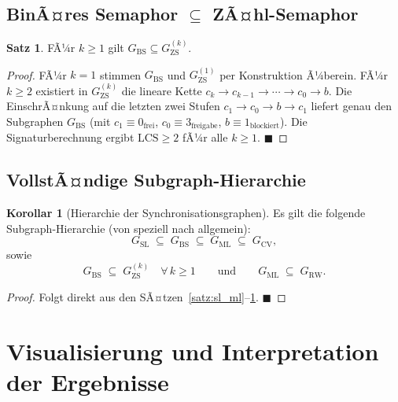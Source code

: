 ﻿\documentclass[a4paper,12pt]{article}
\theoremstyle{definition}
\newtheorem{satz}{Satz}
\newtheorem{korollar}{Korollar}
\begin{document}
\subsection{BinÃ¤res Semaphor $\subseteq$ ZÃ¤hl-Semaphor}

\begin{satz}
  \label{satz:bs_zs}
  FÃ¼r $k \geq 1$ gilt $G_{\mathrm{BS}} \subseteq G_{\mathrm{ZS}}^{(k)}$.
\end{satz}

\begin{proof}
  FÃ¼r $k = 1$ stimmen $G_{\mathrm{BS}}$ und $G_{\mathrm{ZS}}^{(1)}$ per
  Konstruktion Ã¼berein. FÃ¼r $k \geq 2$ existiert in $G_{\mathrm{ZS}}^{(k)}$
  die lineare Kette $c_k \to c_{k-1} \to \cdots \to c_0 \to b$. Die
  EinschrÃ¤nkung auf die letzten zwei Stufen $c_1 \to c_0 \to b \to c_1$
  liefert genau den Subgraphen $G_{\mathrm{BS}}$ (mit $c_1 \equiv
  0_{\mathrm{frei}}$, $c_0 \equiv 3_{\mathrm{freigabe}}$,
  $b \equiv 1_{\mathrm{blockiert}}$).
  Die Signaturberechnung ergibt $\mathrm{LCS} \geq 2$ fÃ¼r alle $k \geq 1$.
  \hfill$\blacksquare$
\end{proof}

\subsection{VollstÃ¤ndige Subgraph-Hierarchie}

\begin{korollar}[Hierarchie der Synchronisationsgraphen]
  \label{kor:hierarchie}
  Es gilt die folgende Subgraph-Hierarchie (von speziell nach allgemein):
  \[
    G_{\mathrm{SL}} \;\subseteq\; G_{\mathrm{BS}} \;\subseteq\;
    G_{\mathrm{ML}} \;\subseteq\; G_{\mathrm{CV}},
  \]
  sowie
  \[
    G_{\mathrm{BS}} \;\subseteq\; G_{\mathrm{ZS}}^{(k)} \quad \forall\, k \geq 1
    \qquad\text{und}\qquad
    G_{\mathrm{ML}} \;\subseteq\; G_{\mathrm{RW}}.
  \]
\end{korollar}

\begin{proof}
  Folgt direkt aus den SÃ¤tzen~\ref{satz:sl_ml}--\ref{satz:bs_zs}.
  \hfill$\blacksquare$
\end{proof}

\section{Visualisierung und Interpretation der Ergebnisse}
\label{sec:plots}
\end{document}
